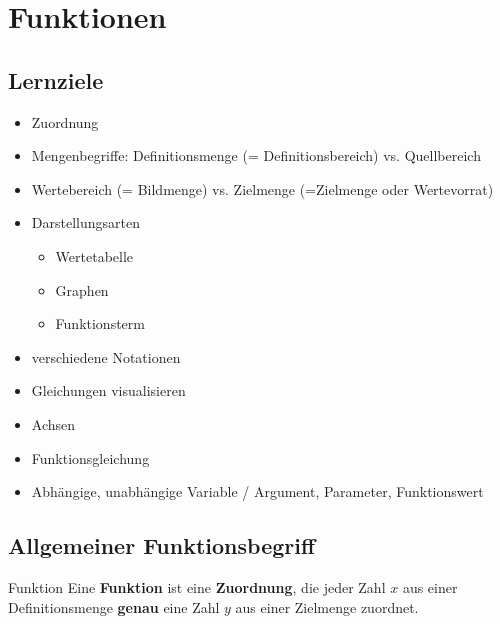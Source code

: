 
\section{Funktionen}
\subsection*{Lernziele}

\begin{itemize}
 \item Zuordnung
 \item Mengenbegriffe: Definitionsmenge (= Definitionsbereich) vs. Quellbereich
 \item Wertebereich (= Bildmenge) vs. Zielmenge
   (=Zielmenge oder Wertevorrat)
 \item Darstellungsarten
   \begin{itemize}
      \item Wertetabelle
      \item Graphen
      \item Funktionsterm
   \end{itemize}
 \item verschiedene Notationen
 \item Gleichungen visualisieren
 \item Achsen
 \item Funktionsgleichung
 \item Abhängige, unabhängige Variable / Argument, Parameter, Funktionswert
\end{itemize}


\newpage
\subsection{Allgemeiner Funktionsbegriff}


\begin{definition}{Funktion}{}
    Eine \textbf{Funktion} ist eine \textbf{Zuordnung}, die jeder Zahl
    $x$ aus einer Definitionsmenge \textbf{genau} eine Zahl $y$ aus
    einer Zielmenge zuordnet.\\
\end{definition}
    
